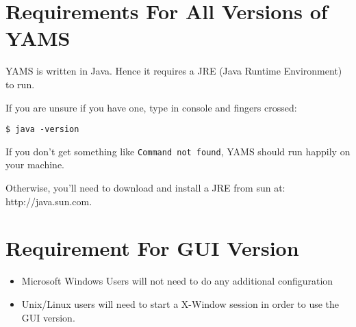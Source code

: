 \section{Requirements For All Versions of YAMS}

YAMS is written in Java. Hence it requires a JRE (Java Runtime Environment) to run.

If you are unsure if you have one, type in console and fingers crossed:

\texttt{\$ java -version}

If you don't get something like \texttt{Command not found}, YAMS should run happily on your machine.

Otherwise, you'll need to download and install a JRE from sun at: http://java.sun.com.




\section{Requirement For GUI Version}

\begin{itemize}
\item Microsoft Windows Users will not need to do any additional configuration
\item Unix/Linux users will need to start a X-Window session in order to use the GUI version.
\end{itemize}

